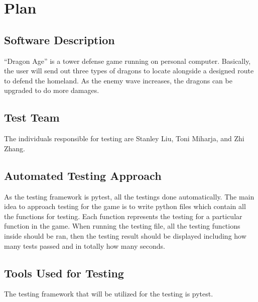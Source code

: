 \documentclass[12,english]{article}
\begin{document}
\section{Plan}
\subsection{Software Description}
“Dragon Age” is a tower defense game running on personal computer. Basically, the user will send out three types of dragons to locate alongside a designed route to defend the homeland. As the enemy wave increases, the dragons can be upgraded to do more damages.

\subsection{Test Team}
The individuals responsible for testing are Stanley Liu, Toni Miharja, and Zhi Zhang.

\subsection{Automated Testing Approach}
As the testing framework is pytest, all the testings done automatically. The main idea to approach testing for the game is to write python files which contain all the functions for testing. Each function represents the testing for a particular function in the game. When running the testing file, all the testing functions inside should be ran, then the testing result should be displayed including how many tests passed and in totally how many seconds.

\subsection{Tools Used for Testing}
The testing framework that will be utilized for the testing is pytest.
\end{document}

